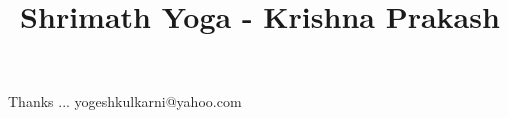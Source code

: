 \documentclass[xcolor=dvipsnames,compress,t,pdf,9pt]{beamer}
\title[\insertframenumber /\inserttotalframenumber]{Shrimath Yoga - Krishna Prakash}
\begin{document}
	\begin{frame}
	\titlepage
	\end{frame}
	
	
	
	\begin{frame}[c]{}
	Thanks ...
	\vspace{5mm}
	yogeshkulkarni@yahoo.com
	\end{frame}
\end{document}
